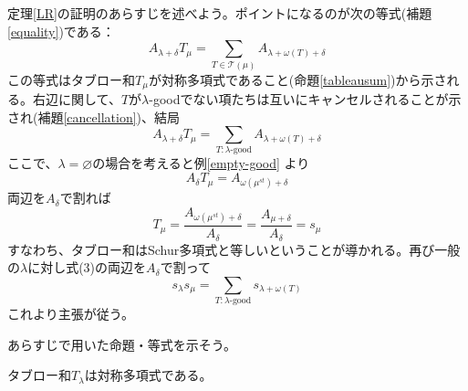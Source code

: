 \documentclass{ltjsreport}
\begin{document}
定理\ref{LR}の証明のあらすじを述べよう。ポイントになるのが次の等式(補題\ref{equality})である：
\[
A_{\lambda+\delta}T_\mu=\sum_{T\in\mathcal{T}(\mu)}A_{\lambda+\omega(T)+\delta} 
\]
この等式はタブロー和$T_\mu$が対称多項式であること(命題\ref{tableausum})から示される。右辺に関して、$T$が$\lambda$-goodでない項たちは互いにキャンセルされることが示され(補題\ref{cancellation})、結局
\begin{equation}
A_{\lambda+\delta}T_\mu=\sum_{T:\lambda\text{-good}}A_{\lambda+\omega(T)+\delta}   
\end{equation}
ここで、$\lambda=\varnothing$の場合を考えると例\ref{empty-good}
より
\[
A_{\delta}T_\mu=A_{\omega({\mu^{st}})+\delta}
\]
両辺を$A_\delta$で割れば
\[
T_\mu=\frac{A_{\omega(\mu^{st})+\delta}}{A_\delta}=\frac{A_{\mu+\delta}}{A_\delta}=s_\mu
\]
すなわち、タブロー和はSchur多項式と等しいということが導かれる。再び一般の$\lambda$に対し式(3)の両辺を$A_\delta$で割って
\[
s_\lambda s_\mu=\sum_{T:\lambda\text{-good}}s_{\lambda+\omega(T)}
\]
これより主張が従う。

あらすじで用いた命題・等式を示そう。

\begin{prop}\label{tableausum}
    タブロー和$T_\lambda$は対称多項式である。
\end{prop}
\end{document}

